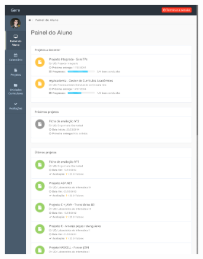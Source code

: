 \begin{figure}[H]
	\centering
	\begin{subfigure}{0.5\textwidth}
 		\centering
 		\includegraphics[width=0.95\textwidth,center]{images/implementacao/alunos/dashboard_small}
 		\label{fig:dashboard_small}
 	\end{subfigure}
 	\begin{subfigure}{0.55\textwidth}
	 	\centering

\end{subfigure}
\end{figure}
